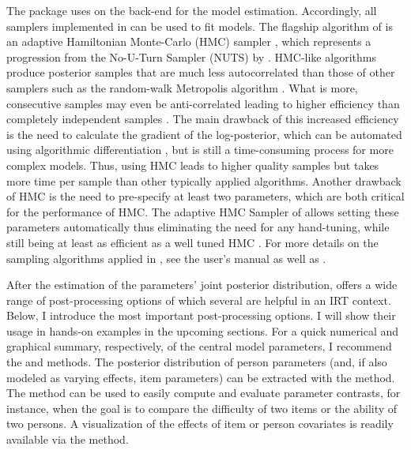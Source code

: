 \documentclass[
]{jss}
\begin{document}
The  package uses  \citep{carpenter2017} on the
back-end for the model estimation. Accordingly, all samplers implemented
in  can be used to fit  models. The flagship
algorithm of  is an adaptive Hamiltonian Monte-Carlo
(HMC) sampler \citep{betancourt2014, betancourt2017, stanM2019}, which
represents a progression from the No-U-Turn Sampler (NUTS) by
\citet{hoffman2014}. HMC-like algorithms produce posterior samples that
are much less autocorrelated than those of other samplers such as the
random-walk Metropolis algorithm \citep{hoffman2014, creutz1988}. What
is more, consecutive samples may even be anti-correlated leading to
higher efficiency than completely independent samples
\citep{vehtari2019}. The main drawback of this increased efficiency is
the need to calculate the gradient of the log-posterior, which can be
automated using algorithmic differentiation \citep{griewank2008}, but is
still a time-consuming process for more complex models. Thus, using HMC
leads to higher quality samples but takes more time per sample than
other typically applied algorithms. Another drawback of HMC is the need
to pre-specify at least two parameters, which are both critical for the
performance of HMC. The adaptive HMC Sampler of  allows
setting these parameters automatically thus eliminating the need for any
hand-tuning, while still being at least as efficient as a well tuned HMC
\citep{hoffman2014}. For more details on the sampling algorithms applied
in , see the  user's manual
\citep{stanM2019} as well as \citet{hoffman2014}.

After the estimation of the parameters' joint posterior distribution,
 offers a wide range of post-processing options of which
several are helpful in an IRT context. Below, I introduce the most
important post-processing options. I will show their usage in hands-on
examples in the upcoming sections. For a quick numerical and graphical
summary, respectively, of the central model parameters, I recommend the
 and  methods. The posterior distribution of
person parameters (and, if also modeled as varying effects, item
parameters) can be extracted with the  method. The
 method can be used to easily compute and evaluate
parameter contrasts, for instance, when the goal is to compare the
difficulty of two items or the ability of two persons. A visualization
of the effects of item or person covariates is readily available via the
 method.
\end{document}
